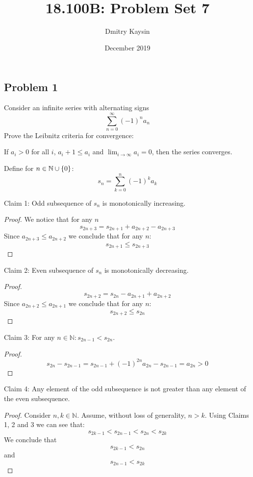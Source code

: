 \documentclass{article}
\title{18.100B: Problem Set 7}
\author{Dmitry Kaysin}
\date{December 2019}
\newcommand{\N}{\mathbb{N}}
\DeclarePairedDelimiter{\set}{ \{ }{ \} }
\begin{document}
\maketitle 

\subsection*{Problem 1}

\begin{tcolorbox}
Consider an infinite series with alternating signs
\[ \sum_{n=0}^\infty (-1)^n a_n \]
Prove the Leibnitz criteria for convergence:

If $a_i > 0$ for all $i$, $a_i+1 \leq a_i$ and $\lim_{i \to \infty} a_i = 0$, then the series converges.
\end{tcolorbox}

Define for $n \in \N \cup \set{0}$:
\[ s_n = \sum_{k=0}^{n} (-1)^k a_k \]

Claim 1: Odd subsequence of $s_n$ is monotonically increasing.

\begin{proof}

We notice that for any $n$
\[ s_{2n+3} = s_{2n+1} + a_{2n+2} - a_{2n+3} \]
Since $a_{2n+3} \leq a_{2n+2}$ we conclude that for any $n$:
\[ s_{2n+1} \leq s_{2n+3} \]

\end{proof}

Claim 2: Even subsequence of $s_n$ is monotonically decreasing.

\begin{proof}

\[ s_{2n+2} = s_{2n} - a_{2n+1} + a_{2n+2} \]
Since $a_{2n+2} \leq a_{2n+1}$ we conclude that for any $n$:
\[ s_{2n+2} \leq s_{2n} \]

\end{proof}

Claim 3: For any $n \in \N : s_{2n-1} < s_{2n}$.

\begin{proof}

\[ s_{2n} - s_{2n-1} = s_{2n-1} + (-1)^{2n} a_{2n} - s_{2n-1} = a_{2n} > 0 \]

\end{proof}

Claim 4: Any element of the odd subsequence is not greater than any element of the even subsequence.

\begin{proof}

Consider $n, k \in \N$. Assume, without loss of generality, $n > k$.
Using Claims 1, 2 and 3 we can see that:
\[ s_{2k-1} < s_{2n-1} < s_{2n} < s_{2k} \]
We conclude that
\[ s_{2k-1} < s_{2n} \]
and
\[ s_{2n-1} < s_{2k} \]

\end{proof}
\end{document}
